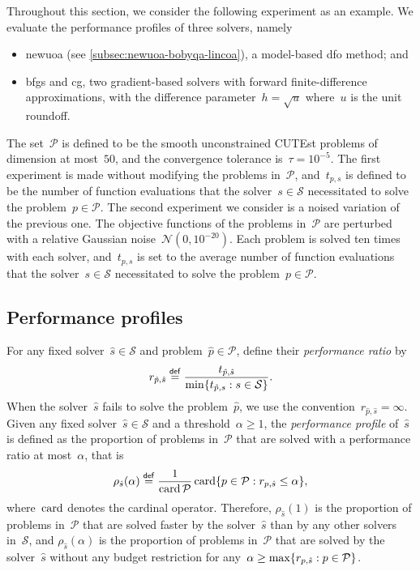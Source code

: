 Throughout this section, we consider the following experiment as an example.
We evaluate the performance profiles of three solvers, namely
\begin{itemize}
    \item \gls{newuoa} (see \cref{subsec:newuoa-bobyqa-lincoa}), a model-based \gls{dfo} method; and
    \item \gls{bfgs} and \gls{cg}, two gradient-based solvers with forward finite-difference approximations, with the difference parameter~$h = \sqrt{u}$ where~$u$ is the unit roundoff.
\end{itemize}
The set~$\mathcal{P}$ is defined to be the smooth unconstrained CUTEst problems of dimension at most~$50$, and the convergence tolerance is~$\tau = 10^{-5}$.
The first experiment is made without modifying the problems in~$\mathcal{P}$, and~$t_{p, s}$ is defined to be the number of function evaluations that the solver~$s \in \mathcal{S}$ necessitated to solve the problem~$p \in \mathcal{P}$.
The second experiment we consider is a noised variation of the previous one.
The objective functions of the problems in~$\mathcal{P}$ are perturbed with a relative Gaussian noise~$\mathcal{N}(0, 10^{-20})$.
Each problem is solved ten times with each solver, and~$t_{p, s}$ is set to the average number of function evaluations that the solver~$s \in \mathcal{S}$ necessitated to solve the problem~$p \in \mathcal{P}$.

\subsection{Performance profiles}

For any fixed solver~$\hat{s} \in \mathcal{S}$ and problem~$\hat{p} \in \mathcal{P}$, define their \emph{performance ratio} by
\begin{equation*}
    r_{\hat{p}, \hat{s}} \mathrel{\stackrel{\mathsf{def}}{=}} \frac{t_{\hat{p}, \hat{s}}}{\min \{t_{\hat{p}, s} : s \in \mathcal{S}\}}.
\end{equation*}
When the solver~$\hat{s}$ fails to solve the problem~$\hat{p}$, we use the convention~$r_{\hat{p}, \hat{s}} = \infty$.
Given any fixed solver~$\hat{s} \in \mathcal{S}$ and a threshold~$\alpha \ge 1$, the \emph{performance profile} of~$\hat{s}$ is defined as the proportion of problems in~$\mathcal{P}$ that are solved with a performance ratio at most~$\alpha$, that is
\begin{equation*}
    \rho_{\hat{s}}(\alpha) \mathrel{\stackrel{\mathsf{def}}{=}} \frac{1}{\operatorname{card} \mathcal{P}} \operatorname{card} \{p \in \mathcal{P} : r_{p, \hat{s}} \le \alpha\},
\end{equation*}
where~$\operatorname{card}$ denotes the cardinal operator.
Therefore, $\rho_{\hat{s}}(1)$ is the proportion of problems in~$\mathcal{P}$ that are solved faster by the solver~$\hat{s}$ than by any other solvers in~$\mathcal{S}$, and $\rho_{\hat{s}}(\alpha)$ is the proportion of problems in~$\mathcal{P}$ that are solved by the solver~$\hat{s}$ without any budget restriction for any~$\alpha \ge \max \{r_{p, \hat{s}} : p \in \mathcal{P}\}$.

